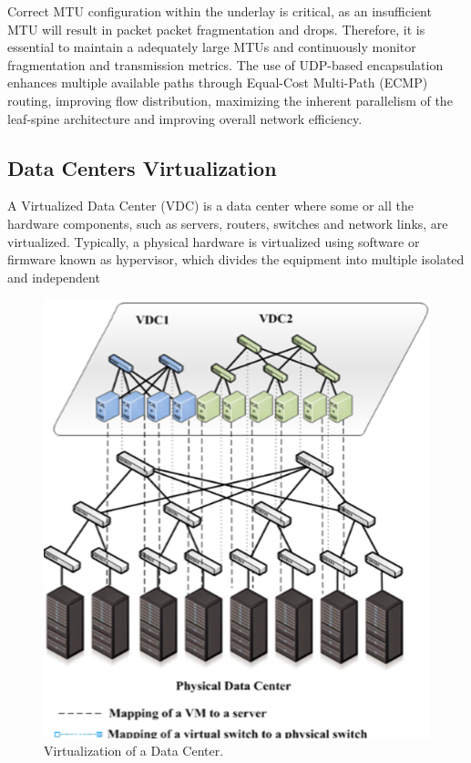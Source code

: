 Correct MTU configuration within the underlay is critical, as an insufficient MTU will result in packet packet fragmentation and drops. Therefore, it is essential to maintain a adequately large MTUs and continuously monitor fragmentation and transmission metrics. The use of UDP-based encapsulation enhances multiple available paths through Equal-Cost Multi-Path (ECMP) routing, improving flow distribution, maximizing the inherent parallelism of the leaf-spine architecture and improving overall network efficiency. \par

\subsection{Data Centers Virtualization}

A Virtualized Data Center (VDC) is a data center where some or all the hardware components, such as servers, routers, switches and network links, are virtualized. Typically, a physical hardware is virtualized using software or firmware known as hypervisor, which divides the equipment into multiple isolated and independent  

\begin{figure}
    \centering
    \vspace{-10pt}
    \includegraphics[width=0.8\linewidth]{Figures/virtualization.png}
    \caption{Virtualization of a Data Center. \cite{bari2013datacenter}}
    \label{virtualization}
    \vspace{-10pt}
\end{figure}

